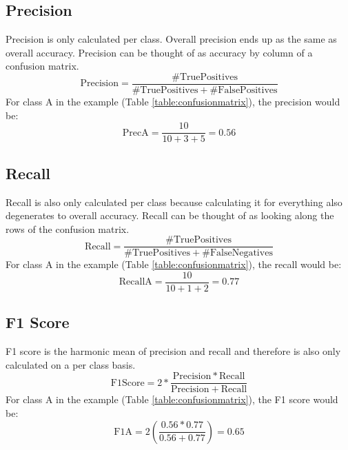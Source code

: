 \subsection{Precision}
Precision is only calculated per class. Overall precision ends up as the
same as overall accuracy. Precision can be thought of as accuracy by column
of a confusion matrix. 
\begin{equation}
    \mathrm{Precision} = \frac{\mathrm{\# True Positives}}{\mathrm{\# True Positives}+\mathrm{\# False Positives}}
\end{equation}
For class A in the example (Table \ref{table:confusionmatrix}), the precision
would be:
\begin{equation}
    \mathrm{PrecA}=\frac{10}{10+3+5} = 0.56
\end{equation}

\subsection{Recall}
Recall is also only calculated per class because calculating it for everything
also degenerates to overall accuracy. Recall can be thought of as looking 
along the rows of the confusion matrix.
\begin{equation}
    \mathrm{Recall} = \frac{\mathrm{\# True Positives}}{\mathrm{\# True Positives}+\mathrm{\# False Negatives}}
\end{equation}
For class A in the example (Table \ref{table:confusionmatrix}), the recall
would be:
\begin{equation}
    \mathrm{RecallA}=\frac{10}{10+1+2} = 0.77
\end{equation}


\subsection{F1 Score}
F1 score is the harmonic mean of precision and recall and therefore is also 
only calculated on a per class basis.
\begin{equation}
    \mathrm{F1 Score} = 2*\frac{\mathrm{Precision*Recall}}{\mathrm{Precision+Recall}}
\end{equation}
For class A in the example (Table \ref{table:confusionmatrix}), the F1 score
would be:
\begin{equation}
    \mathrm{F1A}=2\left(\frac{0.56 * 0.77}{0.56+0.77}\right) = 0.65
\end{equation}



